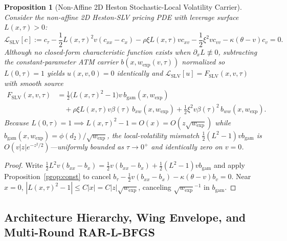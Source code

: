 \documentclass[11pt,a4paper]{article}
\newtheorem{proposition}{Proposition}
\begin{document}
\begin{proposition}[Non-Affine 2D Heston Stochastic-Local Volatility Carrier]
\label{prop:slv}
Consider the non-affine 2D Heston-SLV pricing PDE with leverage surface $L(x, \tau) > 0$:
\begin{equation}
  \mathcal{L}_{\mathrm{SLV}}[c] := c_\tau - \frac{1}{2}L(x,\tau)^2 v(c_{xx} - c_x) - \rho\xi L(x,\tau) v c_{xv} - \frac{1}{2}\xi^2 v c_{vv} - \kappa(\theta - v)c_v = 0.
  \label{eq:slv_pde}
\end{equation}
Although no closed-form characteristic function exists when $\partial_x L \not\equiv 0$, subtracting the constant-parameter ATM carrier $b(x, w_{\mathrm{exp}}(v, \tau))$ normalized so $L(0, \tau) = 1$ yields $u(x, v, 0) = 0$ identically and $\mathcal{L}_{\mathrm{SLV}}[u] = F_{\mathrm{SLV}}(x, v, \tau)$ with smooth source
\begin{equation}
\begin{split}
  F_{\mathrm{SLV}}(x, v, \tau) &= \frac{1}{2}\big(L(x,\tau)^2 - 1\big)v\,b_{\mathrm{gam}}(x, w_{\mathrm{exp}}) \\
  &\quad + \rho\xi L(x,\tau)v\beta(\tau)\,b_{xw}(x, w_{\mathrm{exp}}) + \frac{1}{2}\xi^2 v\beta(\tau)^2\,b_{ww}(x, w_{\mathrm{exp}}).
\end{split}
  \label{eq:f_slv}
\end{equation}
Because $L(0, \tau) = 1 \implies L(x, \tau)^2 - 1 = O(x) = O(z\sqrt{w_{\mathrm{exp}}})$ while $b_{\mathrm{gam}}(x, w_{\mathrm{exp}}) = \phi(d_2)/\sqrt{w_{\mathrm{exp}}}$, the local-volatility mismatch $\frac{1}{2}(L^2 - 1)v b_{\mathrm{gam}}$ is $O(v |z| e^{-z^2/2})$---uniformly bounded as $\tau \to 0^+$ and identically zero on $v = 0$.
\end{proposition}
\begin{proof}
Write $\frac{1}{2}L^2 v(b_{xx} - b_x) = \frac{1}{2}v(b_{xx} - b_x) + \frac{1}{2}(L^2 - 1)v b_{\mathrm{gam}}$ and apply Proposition~\ref{prop:const} to cancel $b_\tau - \frac{1}{2}v(b_{xx} - b_x) - \kappa(\theta - v)b_v = 0$. Near $x = 0$, $|L(x,\tau)^2 - 1| \le C|x| = C|z|\sqrt{w_{\mathrm{exp}}}$, canceling $\sqrt{w_{\mathrm{exp}}}^{-1}$ in $b_{\mathrm{gam}}$.
\end{proof}

\subsection{Architecture Hierarchy, Wing Envelope, and Multi-Round RAR-L-BFGS}
\end{document}
